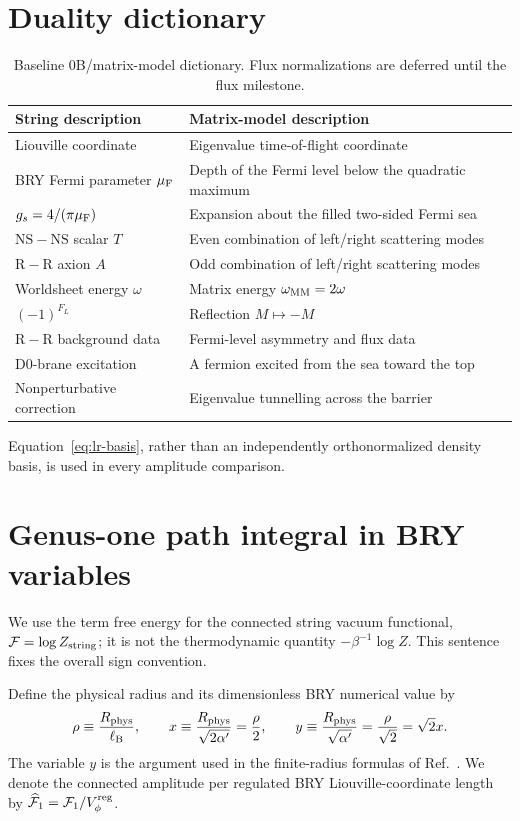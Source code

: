 \documentclass[11pt]{article}
\newcommand{\ap}{\alpha'}
\newcommand{\NSNS}{\mathrm{NS\!\!-\!\!NS}}
\newcommand{\RR}{\mathrm{R\!\!-\!\!R}}
\newcommand{\ellB}{\ell_{\mathrm B}}
\begin{document}
\section{Duality dictionary}

\begin{table}[ht]
\centering
\small
\begin{tabularx}{\textwidth}{@{}p{}X@{}}
\toprule
String description & Matrix-model description \\
\midrule
Liouville coordinate
& Eigenvalue time-of-flight coordinate \\
BRY Fermi parameter $\mu_{\rm F}$
& Depth of the Fermi level below the quadratic maximum \\
$g_s=4/(\pi\mu_{\rm F})$
& Expansion about the filled two-sided Fermi sea \\
$\NSNS$ scalar $T$
& Even combination of left/right scattering modes \\
$\RR$ axion $A$
& Odd combination of left/right scattering modes \\
Worldsheet energy $\omega$
& Matrix energy $\omega_{\rm MM}=2\omega$ \\
$(-1)^{F_L}$
& Reflection $M\mapsto-M$ \\
$\RR$ background data
& Fermi-level asymmetry and flux data \\
D0-brane excitation
& A fermion excited from the sea toward the top \\
Nonperturbative correction
& Eigenvalue tunnelling across the barrier \\
\bottomrule
\end{tabularx}
\caption{Baseline 0B/matrix-model dictionary.  Flux normalizations are
deferred until the flux milestone.}
\label{tab:dictionary}
\end{table}

Equation~\eqref{eq:lr-basis}, rather than an independently orthonormalized
density basis, is used in every amplitude comparison.

\section{Genus-one path integral in BRY variables}

We use the term free energy for the connected string vacuum functional,
$\mathcal F=\log Z_{\rm string}$; it is not the thermodynamic quantity
$-\beta^{-1}\log Z$.  This sentence fixes the overall sign convention.

Define the physical radius and its dimensionless BRY numerical value by
\begin{equation}
 \rho\equiv\frac{R_{\rm phys}}{\ellB},
 \qquad
 x\equiv\frac{R_{\rm phys}}{\sqrt{2\ap}}
 =\frac{\rho}{2},
 \qquad
 y\equiv\frac{R_{\rm phys}}{\sqrt{\ap}}
 =\frac{\rho}{\sqrt2}=\sqrt2x.
 \label{eq:dimensionless-radius}
\end{equation}
The variable $y$ is the argument used in the finite-radius formulas of
Ref.~\cite{DouglasEtAl2003NewHat}.  We denote the connected amplitude per
regulated BRY Liouville-coordinate length by
$\widehat{\mathcal F}_1=\mathcal F_1/V_\phi^{\rm reg}$.
\end{document}
